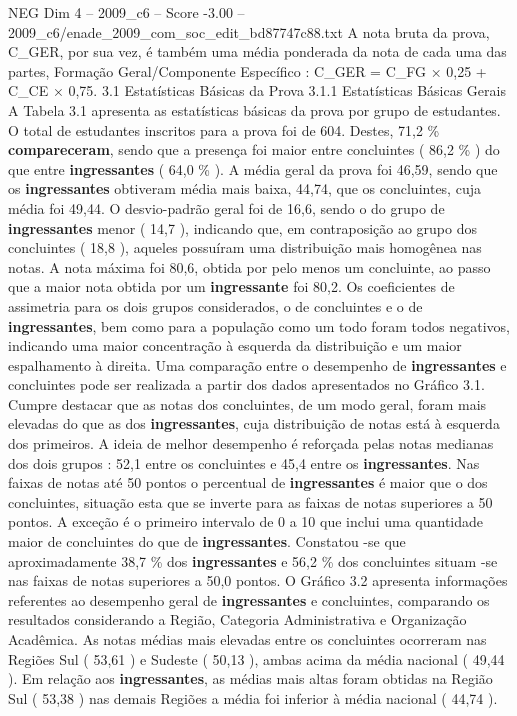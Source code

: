 \begin{textsample}{NEG Dim 4 – 2009\_c6 – Score -3.00 – 2009\_c6/enade\_2009\_com\_soc\_edit\_bd87747c88.txt}
A nota bruta da prova, C\_GER, por sua vez, é também uma média ponderada da nota de cada uma das partes, Formação Geral/Componente Específico : C\_GER = C\_FG × 0,25 + C\_CE × 0,75. 3.1 Estatísticas Básicas da Prova 3.1.1 Estatísticas Básicas Gerais A Tabela 3.1 apresenta as estatísticas básicas da prova por grupo de estudantes.
O total de estudantes inscritos para a prova foi de 604.
Destes, 71,2 \% \textbf{compareceram}, sendo que a presença foi maior entre concluintes ( 86,2 \% ) do que entre \textbf{ingressantes} ( 64,0 \% ).
A média geral da prova foi 46,59, sendo que os \textbf{ingressantes} obtiveram média mais baixa, 44,74, que os concluintes, cuja média foi 49,44.
O desvio-padrão geral foi de 16,6, sendo o do grupo de \textbf{ingressantes} menor ( 14,7 ), indicando que, em contraposição ao grupo dos concluintes ( 18,8 ), aqueles possuíram uma distribuição mais homogênea nas notas.
A nota máxima foi 80,6, obtida por pelo menos um concluinte, ao passo que a maior nota obtida por um \textbf{ingressante} foi 80,2.
Os coeficientes de assimetria para os dois grupos considerados, o de concluintes e o de \textbf{ingressantes}, bem como para a população como um todo foram todos negativos, indicando uma maior concentração à esquerda da distribuição e um maior espalhamento à direita.
Uma comparação entre o desempenho de \textbf{ingressantes} e concluintes pode ser realizada a partir dos dados apresentados no Gráfico 3.1.
Cumpre destacar que as notas dos concluintes, de um modo geral, foram mais elevadas do que as dos \textbf{ingressantes}, cuja distribuição de notas está à esquerda dos primeiros.
A ideia de melhor desempenho é reforçada pelas notas medianas dos dois grupos : 52,1 entre os concluintes e 45,4 entre os \textbf{ingressantes}.
Nas faixas de notas até 50 pontos o percentual de \textbf{ingressantes} é maior que o dos concluintes, situação esta que se inverte para as faixas de notas superiores a 50 pontos.
A exceção é o primeiro intervalo de 0 a 10 que inclui uma quantidade maior de concluintes do que de \textbf{ingressantes}.
Constatou -se que aproximadamente 38,7 \% dos \textbf{ingressantes} e 56,2 \% dos concluintes situam -se nas faixas de notas superiores a 50,0 pontos.
O Gráfico 3.2 apresenta informações referentes ao desempenho geral de \textbf{ingressantes} e concluintes, comparando os resultados considerando a Região, Categoria Administrativa e Organização Acadêmica.
As notas médias mais elevadas entre os concluintes ocorreram nas Regiões Sul ( 53,61 ) e Sudeste ( 50,13 ), ambas acima da média nacional ( 49,44 ).
Em relação aos \textbf{ingressantes}, as médias mais altas foram obtidas na Região Sul ( 53,38 ) nas demais Regiões a média foi inferior à média nacional ( 44,74 ).

\end{textsample}
